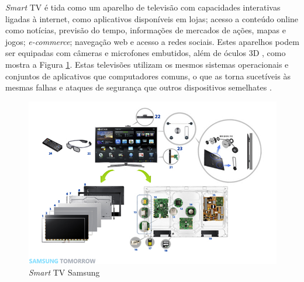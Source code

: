 
\emph{Smart} TV é tida como um aparelho de televisão com capacidades interativas ligadas à internet, como aplicativos disponíveis em lojas; acesso a conteúdo online como notícias, previsão do tempo, informações de mercados de ações, mapas e jogos; \emph{e-commerce}; navegação web e acesso a redes sociais\cite{shin2013smart}. Estes aparelhos podem ser equipadas com câmeras e microfones embutidos\cite{michele2014watch}, além de óculos 3D \cite{perakakis2015proposed}, como mostra a Figura \ref{fig:smart_samsung}. Estas televisões utilizam os mesmos sistemas operacionais e conjuntos de aplicativos que computadores comuns, o que as torna sucetíveis às mesmas falhas e ataques de segurança que outros dispositivos semelhates \cite{michele2014watch}.
\begin{figure}
	\includegraphics[width=\textwidth]{img/smart_samsung.jpg}
	\caption{\emph{Smart} TV Samsung}
	\label{fig:smart_samsung}
\end{figure}

